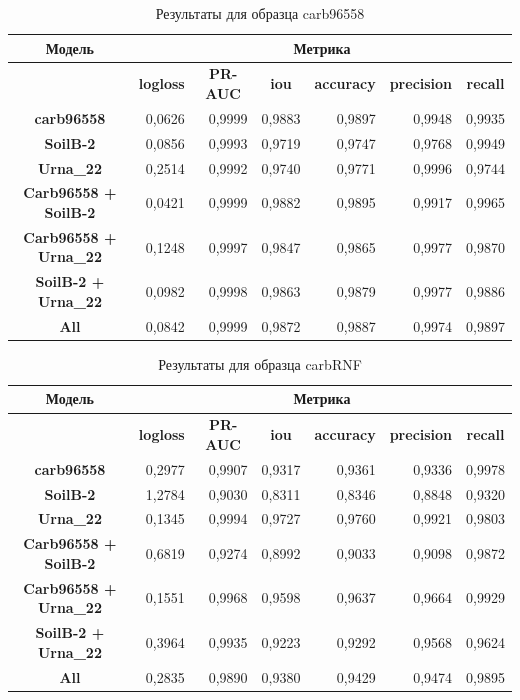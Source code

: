 \documentclass[14pt, a4paper, oneside, bold]{extarticle}
\begin{document}
\begin{table}[htbp]
\small
\begin{tabular}{|c|r|r|r|r|r|r|}
\hline
\textbf{Модель} & \multicolumn{ 6}{c|}{\textbf{Метрика}} \\ \hline
\textbf{} & \multicolumn{1}{c|}{\textbf{logloss}} & \multicolumn{1}{c|}{\textbf{PR-AUC}} & \multicolumn{1}{c|}{\textbf{iou}} & \multicolumn{1}{c|}{\textbf{accuracy}} & \multicolumn{1}{c|}{\textbf{precision}} & \multicolumn{1}{c|}{\textbf{recall}} \\ \hline
\textbf{carb96558} & 0,0626 & 0,9999 & 0,9883 & 0,9897 & 0,9948 & 0,9935 \\ \hline
\textbf{SoilB-2} & 0,0856 & 0,9993 & 0,9719 & 0,9747 & 0,9768 & 0,9949 \\ \hline
\textbf{Urna\_22} & 0,2514 & 0,9992 & 0,9740 & 0,9771 & 0,9996 & 0,9744 \\ \hline
\textbf{Carb96558 + SoilB-2} & 0,0421 & 0,9999 & 0,9882 & 0,9895 & 0,9917 & 0,9965 \\ \hline
\textbf{Carb96558 + Urna\_22} & 0,1248 & 0,9997 & 0,9847 & 0,9865 & 0,9977 & 0,9870 \\ \hline
\textbf{SoilB-2 + Urna\_22} & 0,0982 & 0,9998 & 0,9863 & 0,9879 & 0,9977 & 0,9886 \\ \hline
\textbf{All} & 0,0842 & 0,9999 & 0,9872 & 0,9887 & 0,9974 & 0,9897 \\ \hline
\end{tabular}
\caption{Результаты для образца carb96558}
\label{carb96558}
\end{table}


\begin{table}[htbp]
\small
\begin{tabular}{|c|r|r|r|r|r|r|}
\hline
\textbf{Модель} & \multicolumn{ 6}{c|}{\textbf{Метрика}} \\ \hline
\textbf{} & \multicolumn{1}{c|}{\textbf{logloss}} & \multicolumn{1}{c|}{\textbf{PR-AUC}} & \multicolumn{1}{c|}{\textbf{iou}} & \multicolumn{1}{c|}{\textbf{accuracy}} & \multicolumn{1}{c|}{\textbf{precision}} & \multicolumn{1}{c|}{\textbf{recall}} \\ \hline
\textbf{carb96558} & 0,2977 & 0,9907 & 0,9317 & 0,9361 & 0,9336 & 0,9978 \\ \hline
\textbf{SoilB-2} & 1,2784 & 0,9030 & 0,8311 & 0,8346 & 0,8848 & 0,9320 \\ \hline
\textbf{Urna\_22} & 0,1345 & 0,9994 & 0,9727 & 0,9760 & 0,9921 & 0,9803 \\ \hline
\textbf{Carb96558 + SoilB-2} & 0,6819 & 0,9274 & 0,8992 & 0,9033 & 0,9098 & 0,9872 \\ \hline
\textbf{Carb96558 + Urna\_22} & 0,1551 & 0,9968 & 0,9598 & 0,9637 & 0,9664 & 0,9929 \\ \hline
\textbf{SoilB-2 + Urna\_22} & 0,3964 & 0,9935 & 0,9223 & 0,9292 & 0,9568 & 0,9624 \\ \hline
\textbf{All} & 0,2835 & 0,9890 & 0,9380 & 0,9429 & 0,9474 & 0,9895 \\ \hline
\end{tabular}
\caption{Результаты для образца carbRNF}
\label{carbRNF}
\end{table}
\end{document}

